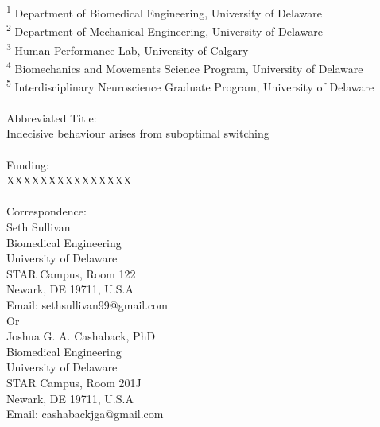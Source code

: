 \documentclass[12pt,letterpaper]{article}
\begin{document}
\textsuperscript{1} Department of Biomedical Engineering, University of Delaware\\
\textsuperscript{2} Department of Mechanical Engineering, University of Delaware\\
\textsuperscript{3} Human Performance Lab, University of Calgary\\
\textsuperscript{4} Biomechanics and Movements Science Program, University of Delaware\\
\textsuperscript{5} Interdisciplinary Neuroscience Graduate Program, University of Delaware\\
\vspace{15mm}
\\
\textcolor{mydarkblue}{\large Abbreviated Title:}
\vspace{1mm}
\\
Indecisive behaviour arises from suboptimal switching
\\
\vspace{15mm}
\\
\textcolor{mydarkblue}{\large Funding:}
\vspace{1mm}
\\
XXXXXXXXXXXXXXX
\\
\vspace{10mm}
\\
\textcolor{mydarkblue}{\large Correspondence:}
\vspace{1mm}
\\
Seth Sullivan\\
Biomedical Engineering\\
University of Delaware\\
STAR Campus, Room 122\\
Newark, DE 19711, U.S.A\\
Email: sethsullivan99@gmail.com
\vspace{2mm}
\\
Or
\vspace{2mm}
\\
Joshua G. A. Cashaback, PhD\\
Biomedical Engineering\\
University of Delaware\\
STAR Campus, Room 201J\\
Newark, DE 19711, U.S.A\\
Email: cashabackjga@gmail.com
\end{document}
